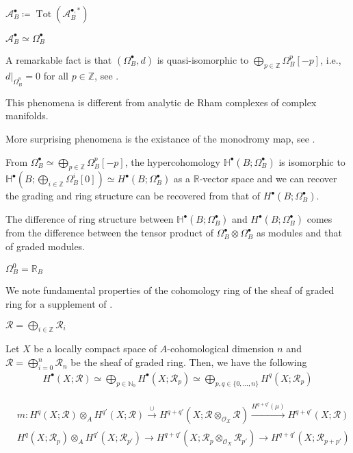 \documentclass[a4paper,dvipdfmx,reqno,12pt]{amsart}
\theoremstyle{definition}
\newcommand{\deq}{\coloneqq}
\newcommand{\R}{\mathbb{R}}%
\newcommand{\Z}{\mathbb{Z}}%
\newcommand{\N}{\mathbb{N}_{0}}%
\newcommand{\mb}[1]{\mathbb{#1}}%
\newcommand{\mcal}[1]{\mathcal{#1}}%
\newcommand{\opn}[1]{\operatorname{#1}}
\newcommand{\xto}[1]{\xrightarrow{#1}}
\numberwithin{equation}{section}
\begin{document}
$\mcal{A}_B^{\bullet}\deq \opn{Tot}(\mcal{A}_B^{\bullet,*})$

$\mcal{A}_B^{\bullet}\simeq \Omega_B^{\bullet}$ \cite[Proposition 3.5]{}

A remarkable fact is that $(\Omega_B^{\bullet},d)$ is
quasi-isomorphic to $\bigoplus_{p\in \Z}\Omega_B^{p}[-p]$, i.e.,
$d|_{\Omega_{B}^{p}}=0$ for all $p\in \Z$, see \cite[Corollary 2.15]{}.

This phenomena is different from analytic de Rham complexes of
complex manifolds.

More surprising phenomena is the existance of the monodromy map,
see \cite{}.

From $\Omega_B^{\bullet}\simeq \bigoplus_{p\in \Z}\Omega_B^{p}[-p]$,
the hypercohomology
$\mb{H}^{\bullet}(B;\Omega_B^{\bullet})$ is isomorphic to
$\mb{H}^{\bullet}(B;\bigoplus_{i\in\Z}\Omega_B^{i}[0])
  \simeq H^{\bullet}(B;\Omega_B^{\bullet})$
as a $\R$-vector space and we can recover the grading
and ring structure can be recovered from
that of $H^{\bullet}(B;\Omega_B^{\bullet})$.

The difference of ring structure between $\mb{H}^{\bullet}(B;\Omega_B^{\bullet})$
and $H^{\bullet}(B;\Omega_B^{\bullet})$ comes from the difference between
the tensor product of $\Omega_B^{\bullet}\otimes \Omega_B^{\bullet}$ as modules and
that of graded modules.


$\Omega_B^{0}=\R_B$





We note fundamental properties of the cohomology ring 
of the sheaf of graded ring for a supplement of \cite{}.

$\mcal{R}=\bigoplus_{i\in \Z}\mcal{R}_{i}$

Let $X$ be a locally compact space of $A$-cohomological dimension $n$ and $\mcal{R}=\bigoplus_{i=0}^{n}\mcal{R}_{n}$ be the sheaf of graded ring.
Then, we have the following
\begin{align}
  H^{\bullet}(X;\mcal{R})\simeq \bigoplus_{p \in \N} H^{\bullet}(X;\mcal{R}_{p})\simeq \bigoplus_{p,q\in \{0,\ldots , n\}} H^{q}(X;\mcal{R}_{p})
\end{align}

\begin{align}
   & m: H^{q}(X;\mcal{R})\otimes_{A} H^{q'}(X;\mcal{R}) \xto{\cup} H^{q+q'}(X;\mcal{R}\otimes_{\mcal{O}_X} \mcal{R})\xto{H^{q+q'}(\mu)} H^{q+q'}(X;\mcal{R}) \\
   & H^{q}(X;\mcal{R}_{p})\otimes_{A} H^{q'}(X;\mcal{R}_{p'}) \to H^{q+q'}(X;\mcal{R}_{p}\otimes_{\mcal{O}_X} \mcal{R}_{p'})\to H^{q+q'}(X;\mcal{R}_{p+p'})
\end{align}
\end{document}
